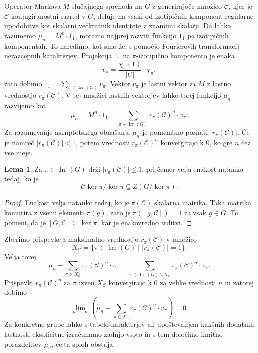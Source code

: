 \documentclass[11pt]{book}
\def\conclass{\mathcal{C}}
\DeclareMathOperator\Irr{Irr}
\theoremstyle{definition}
\theoremstyle{zgled}
\theoremstyle{odprtproblem}
\theoremstyle{domacanaloga}
\newenvironment{dokaz}
    {\color{siva}\begin{proof}}
    {\end{proof}}
\theoremstyle{izrek}
\newtheorem*{lema}{Lema}
\begin{document}
Operator Markova $M$ slučajnega sprehoda na $G$ z generirajočo množico $\conclass$, kjer je $\conclass$ konjugiranostni razred v $G$, deluje na vsaki od izotipičnih komponent regularne upodobitve kot skalarni večkratnik identitete z znamimi skalarji. Da lahko razumemo $\mu_n = M^n \cdot 1_1$, moramo najprej razviti funkcijo $1_1$ po izotipičnih komponentah. To naredimo, kot smo že, s pomočjo Fourierovih transformacij nerazcepnih karakterjev. Projekcija $1_1$ na $\pi$-izotipično komponento je enaka
\[
    v_{\pi} = \frac{\chi_{\pi}(1)}{|G|} \cdot \chi_{\pi},
\] 
zato dobimo $1_1 = \sum_{\pi \in \Irr(G)} v_{\pi}$. Vektor $v_{\pi}$ je lastni vektor za $M$ z lastno vrednostjo $r_{\pi}(\conclass)$. V tej množici lastnih vektorjev lahko torej funkcijo $\mu_n$ razvijemo kot
\[
    \mu_n = M^n \cdot 1_1 = \sum_{\pi \in \Irr(G)} r_{\pi}(\conclass)^n \cdot v_{\pi}.
\]
Za razumevanje asimptotskega obnašanja $\mu_n$ je pomembno poznati $|r_{\pi}(\conclass)|$. Če je namreč $|r_{\pi}(\conclass)| < 1$, potem vrednosti $r_{\pi}(\conclass)^n$ konvergirajo k $0$, ko gre $n$ čez vse meje.

\begin{lema}
Za $\pi \in \Irr(G)$ drži $|r_{\pi}(\conclass)| \leq 1$, pri čemer velja enakost natanko tedaj, ko je 
\[
    \conclass \ker \pi / \ker \pi \subseteq Z(G / \ker \pi).
\]
\end{lema}
\begin{dokaz}
Enakost velja natanko tedaj, ko je $\pi(\conclass)$ skalarna matrika. Taka matrika komutira z vsemi elementi $\pi(g)$, zato je $\pi([g, \conclass]) = 1$ za vsak $g \in G$. To pomeni, da je $[G, \conclass] \subseteq \ker \pi$, kar je enakovredno trditvi.
\end{dokaz}

Zberimo prispevke z maksimalno vrednostjo $r_{\pi}(\conclass)$ v množico
\[
    X_{\conclass} = \{ \pi \in \Irr(G) \mid |r_{\pi}(\conclass)| = 1 \}.
\]
Velja torej
\[
    \mu_n - \sum_{\pi \in X_{\conclass}} r_{\pi}(\conclass)^n \cdot v_{\pi}
    = \sum_{\pi \in \Irr(G) \backslash X_{\conclass}} r_{\pi}(\conclass)^n \cdot v_{\pi}.
\]
Prispevki $r_{\pi}(\conclass)^n$ za $\pi$ izven $X_{\conclass}$ konvergirajo k $0$ za velike vrednosti $n$ in zatorej dobimo
\[
    \lim_{n \to \infty} \left( \mu_n - \sum_{\pi \in X_C} r_{\pi}(\conclass)^n \cdot v_{\pi} \right) = 0.
\]
Za konkretne grupe lahko s tabelo karakterjev ali upoštevanjem kakšnih dodatnih lastnosti eksplicitno izračunamo zadnjo vsoto in s tem določimo limitno porazdelitev $\mu_n$, če ta sploh obstaja.
\end{document}
